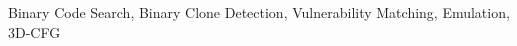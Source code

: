 \documentclass[10pt,journal,compsoc]{IEEEtran}
\newcommand{\tool}{\textsc{BinGo}\xspace}
\begin{document}
{\begin{abstract}

\end{abstract}

\begin{IEEEkeywords}
Binary Code Search, Binary Clone Detection, Vulnerability Matching, Emulation, 3D-CFG
\end{IEEEkeywords}}


\maketitle


\IEEEdisplaynontitleabstractindextext



%
\IEEEpeerreviewmaketitle
\end{document}
